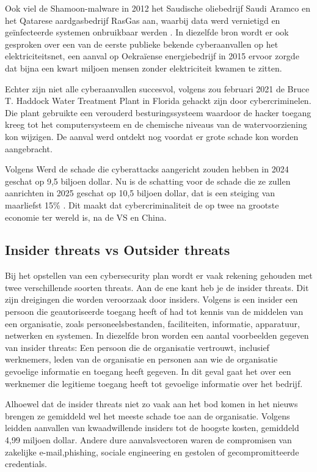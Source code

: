 Ook viel de Shamoon-malware in 2012 het Saudische oliebedrijf Saudi Aramco en het Qatarese aardgasbedrijf RasGas aan, waarbij data werd vernietigd en geïnfecteerde systemen onbruikbaar werden \autocite{Hemsley2018}.
In diezelfde bron wordt er ook gesproken over een van de eerste publieke bekende cyberaanvallen op het elektriciteitsnet, een aanval op Oekraïense energiebedrijf in 2015 ervoor zorgde dat bijna een kwart miljoen mensen zonder elektriciteit kwamen te zitten.

Echter zijn niet alle cyberaanvallen succesvol, volgens \textcite{Margolin2021} zou februari 2021 de Bruce T. Haddock Water Treatment Plant in Florida gehackt zijn door cybercriminelen. Die plant gebruikte een verouderd besturingssysteem waardoor de hacker toegang kreeg tot het computersysteem en de chemische niveaus van de watervoorziening kon wijzigen. De aanval werd ontdekt nog voordat er grote schade kon worden aangebracht.



Volgens \textcite{Morgan2024} Werd de schade die cyberattacks aangericht zouden hebben in 2024 geschat op 9,5 biljoen dollar. Nu is de schatting voor de schade die ze zullen aanrichten in 2025 geschat op 10,5 biljoen dollar, dat is een steiging van maarliefst 15\% . Dit maakt dat cybercriminaliteit de op twee na grootste economie ter wereld is, na de VS en China.

\subsection{Insider threats vs Outsider threats}
Bij het opstellen van een cybersecurity plan wordt er vaak rekening gehouden met twee verschillende soorten threats. Aan de ene kant heb je de insider threats. Dit zijn dreigingen die worden veroorzaak door insiders. Volgens \textcite{Cisa2025} is een insider een persoon die geautoriseerde toegang heeft of had tot kennis van de middelen van een organisatie, zoals personeelsbestanden, faciliteiten, informatie, apparatuur, netwerken en systemen. In diezelfde bron worden een aantal voorbeelden gegeven van insider threats: Een persoon die de organisatie vertrouwt, inclusief werknemers, leden van de organisatie en personen aan wie de organisatie gevoelige informatie en toegang heeft gegeven. In dit geval gaat het over een werknemer die legitieme toegang heeft tot gevoelige informatie over het bedrijf.

Alhoewel dat de insider threats niet zo vaak aan het bod komen in het nieuws brengen ze gemiddeld wel het meeste schade toe aan de organisatie. Volgens \textcite{ibm2024} leidden aanvallen van kwaadwillende insiders tot de hoogste kosten, gemiddeld 4,99 miljoen dollar. Andere dure aanvalsvectoren waren de compromisen van zakelijke e-mail,phishing, sociale engineering en gestolen of gecompromitteerde credentials. 

